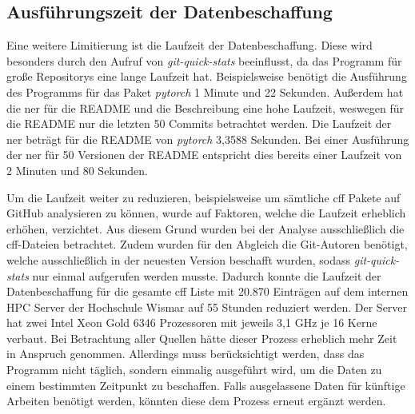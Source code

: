 \subsection*{Ausführungszeit der Datenbeschaffung}
\label{subsec:ausfuehrungszeit_der_datenbeschaffung}
Eine weitere Limitierung ist die Laufzeit der Datenbeschaffung.
Diese wird besonders durch den Aufruf von \emph{git-quick-stats} beeinflusst, da das Programm für große Repositorys eine lange Laufzeit hat.
Beispielsweise benötigt die Ausführung des Programms für das Paket \emph{pytorch} 1 Minute und 22 Sekunden.
Außerdem hat die \gls{ner} für die README und die Beschreibung eine hohe Laufzeit, weswegen für die README nur die letzten 50 Commits betrachtet werden.
Die Laufzeit der \gls{ner} beträgt für die README von \emph{pytorch} 3,3588 Sekunden.
Bei einer Ausführung der \gls{ner} für 50 Versionen der README entspricht dies bereits einer Laufzeit von 2 Minuten und 80 Sekunden.

Um die Laufzeit weiter zu reduzieren, beispielsweise um sämtliche \gls{cff} Pakete auf GitHub analysieren zu können, wurde auf Faktoren, welche die Laufzeit erheblich erhöhen, verzichtet.
Aus diesem Grund wurden bei der Analyse ausschließlich die \gls{cff}-Dateien betrachtet.
Zudem wurden für den Abgleich die Git-Autoren benötigt, welche ausschließlich in der neuesten Version beschafft wurden, sodass \emph{git-quick-stats} nur einmal aufgerufen werden musste.
Dadurch konnte die Laufzeit der Datenbeschaffung für die gesamte \gls{cff} Liste mit 20.870 Einträgen auf dem internen HPC Server der Hochschule Wismar auf 55 Stunden reduziert werden.
Der Server hat zwei Intel Xeon Gold 6346 Prozessoren mit jeweils 3,1 GHz je 16 Kerne verbaut.
Bei Betrachtung aller Quellen hätte dieser Prozess erheblich mehr Zeit in Anspruch genommen.
Allerdings muss berücksichtigt werden, dass das Programm nicht täglich, sondern einmalig ausgeführt wird, um die Daten zu einem bestimmten Zeitpunkt zu beschaffen.
Falls ausgelassene Daten für künftige Arbeiten benötigt werden, könnten diese dem Prozess erneut ergänzt werden.

